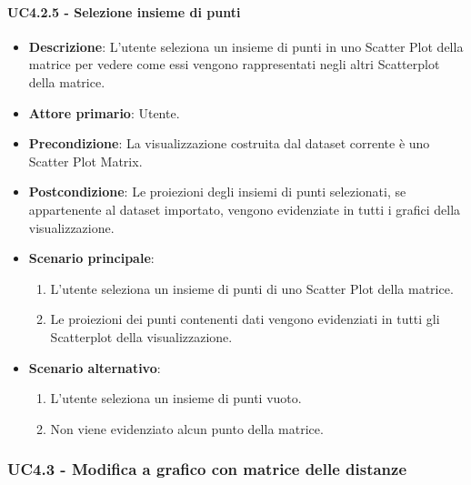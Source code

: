 \paragraph{UC4.2.5 - Selezione insieme di punti}
\label{par:uc4.2.5}
\begin{itemize}
    \item \textbf{Descrizione}: L'utente seleziona un insieme di punti in uno Scatter Plot della matrice per vedere come
                                essi vengono rappresentati negli altri Scatterplot della matrice.

    \item \textbf{Attore primario}: Utente.

    \item \textbf{Precondizione}:   La visualizzazione costruita dal dataset corrente è uno Scatter Plot Matrix.
    \item \textbf{Postcondizione}:  Le proiezioni degli insiemi di punti selezionati, se appartenente al dataset importato,
                                    vengono evidenziate in tutti i grafici della visualizzazione.

	\item \textbf{Scenario principale}:
        \begin{enumerate}
            \item L'utente seleziona un insieme di punti di uno Scatter Plot della matrice.
            \item Le proiezioni dei punti contenenti dati vengono evidenziati in tutti gli Scatterplot della visualizzazione.
        \end{enumerate}

    \item \textbf{Scenario alternativo}:
        \begin{enumerate}
            \item L'utente seleziona un insieme di punti vuoto.
            \item Non viene evidenziato alcun punto della matrice.
        \end{enumerate}

\end{itemize}

\newpage
\subsubsection{UC4.3 - Modifica a grafico con matrice delle distanze}
\label{ssub:uc4.3}

